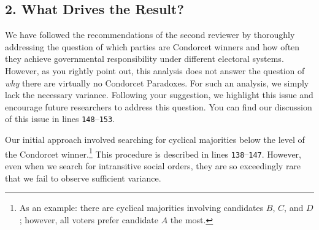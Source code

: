 \documentclass[a4paper, 12pt]{scrartcl}
\begin{document}
\subsection*{2. What Drives the Result?}
We have followed the recommendations of the second reviewer by thoroughly addressing the question of which parties are Condorcet winners and how often they achieve governmental responsibility under different electoral systems. However, as you rightly point out, this analysis does not answer the question of \textit{why} there are virtually no Condorcet Paradoxes. For such an analysis, we simply lack the necessary variance. Following your suggestion, we highlight this issue and encourage future researchers to address this question. You can find our discussion of this issue in lines \texttt{148$–$153}. 

Our initial approach involved searching for cyclical majorities below the level of the Condorcet winner.\footnote{
	As an example: there are cyclical majorities involving candidates $B$, $C$, and $D$; however, all voters prefer candidate $A$ the most.
} This procedure is described in lines \texttt{138$–$147}. However, even when we search for intransitive social orders, they are so exceedingly rare that we fail to observe sufficient variance.



%
%
\end{document}
